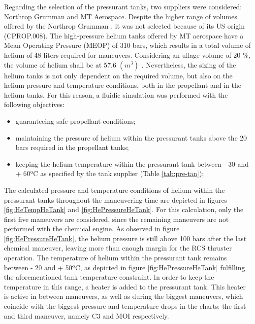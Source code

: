 \documentclass[conference]{IEEEtran}
\begin{document}
Regarding the selection of the pressurant tanks, two suppliers were considered: Northrop Grumman and MT Aerospace. Despite the higher range of volumes offered by the Northrop Grumman \cite{Pressura17:online}, it was not selected because of its US origin (CPROP.008). The high-pressure helium tanks offered by MT aerospace have a Mean Operating Pressure (MEOP) of 310 bars, which results in a total volume of helium of 48 liters required for maneuvers. Considering an ullage volume of 20 \%, the volume of helium shall be at 57.6 $(m^3)$ \cite{Manfletti.2022}. Nevertheless, the sizing of the helium tanks is not only dependent on the required volume, but also on the helium pressure and temperature conditions, both in the propellant and in the helium tanks. 
For this reason, a fluidic simulation was performed with the following objectives:
\begin{itemize}
    \item guaranteeing safe propellant conditions;
    \item maintaining the pressure of helium within the pressurant tanks above the 20 bars required in the propellant tanks; 
    \item keeping the helium temperature within the pressurant tank between - 30 and + 60ºC as specified by the tank supplier (Table \ref{tab:pre-tan});
\end{itemize}
The calculated pressure and temperature conditions of helium within the pressurant tanks throughout the maneuvering time are depicted in figures \ref{fig:HeTempHeTank} and \ref{fig:HePressureHeTank}. For this calculation, only the first five maneuvers are considered, since the remaining maneuvers are not performed with the chemical engine. 
As observed in figure \ref{fig:HePressureHeTank}, the helium pressure is still above 100 bars after the last chemical maneuver, leaving more than enough margin for the RCS thruster operation. The temperature of helium within the pressurant tank remains between - 20 and + 50ºC, as depicted in figure \ref{fig:HePressureHeTank} fulfilling the aforementioned tank temperature constraint. In order to keep the temperature in this range, a heater is added to the pressurant tank. This heater is active in between maneuvers, as well as during the biggest maneuvers, which coincide with the biggest pressure and temperature drops in the charts: the first and third maneuver, namely C3 and MOI respectively.
\end{document}
